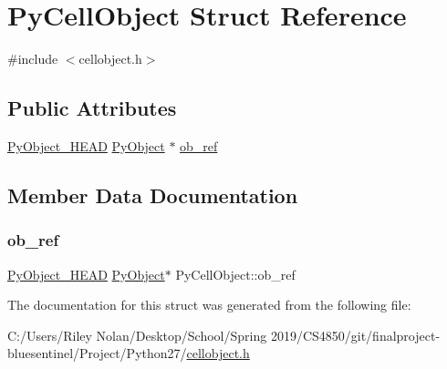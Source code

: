 \hypertarget{struct_py_cell_object}{}\section{Py\+Cell\+Object Struct Reference}
\label{struct_py_cell_object}


{\ttfamily \#include $<$cellobject.\+h$>$}

\subsection*{Public Attributes}
\begin{DoxyCompactItemize}
\item 
\mbox{\hyperlink{_python27_2object_8h_a0bf35c1f3ea13f925de94d8593db3b7e}{Py\+Object\+\_\+\+H\+E\+AD}} \mbox{\hyperlink{_python27_2object_8h_aadc84ac7aed2cfa6f20c25f62bf3dac7}{Py\+Object}} $\ast$ \mbox{\hyperlink{struct_py_cell_object_a8801f944d71f980fbb18f94562ab38a1}{ob\+\_\+ref}}
\end{DoxyCompactItemize}


\subsection{Member Data Documentation}
\mbox{\label{struct_py_cell_object_a8801f944d71f980fbb18f94562ab38a1}} 
\subsubsection{\texorpdfstring{ob\_ref}{ob\_ref}}
{\footnotesize\ttfamily \mbox{\hyperlink{_python27_2object_8h_a0bf35c1f3ea13f925de94d8593db3b7e}{Py\+Object\+\_\+\+H\+E\+AD}} \mbox{\hyperlink{_python27_2object_8h_aadc84ac7aed2cfa6f20c25f62bf3dac7}{Py\+Object}}$\ast$ Py\+Cell\+Object\+::ob\+\_\+ref}



The documentation for this struct was generated from the following file\+:\begin{DoxyCompactItemize}
\item 
C\+:/\+Users/\+Riley Nolan/\+Desktop/\+School/\+Spring 2019/\+C\+S4850/git/finalproject-\/bluesentinel/\+Project/\+Python27/\mbox{\hyperlink{cellobject_8h}{cellobject.\+h}}\end{DoxyCompactItemize}

